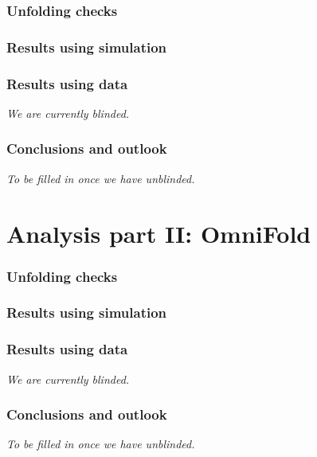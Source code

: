 \documentclass[NOTE, atlasdraft=true, texlive=2016, UKenglish]{\ATLASLATEXPATH atlasdoc}
\begin{document}
\section{Unfolding checks}


\section{Results using simulation}


\section{Results using data}

\textit{We are currently blinded.}

\section{Conclusions and outlook}

\textit{To be filled in once we have unblinded.}

\part{Analysis part II: OmniFold}
\label{part:omnifold}

\section{Unfolding checks}


\section{Results using simulation}


\section{Results using data}

\textit{We are currently blinded.}

\section{Conclusions and outlook}
\label{sec:conclusion}

\textit{To be filled in once we have unblinded.}

\clearpage
\end{document}

